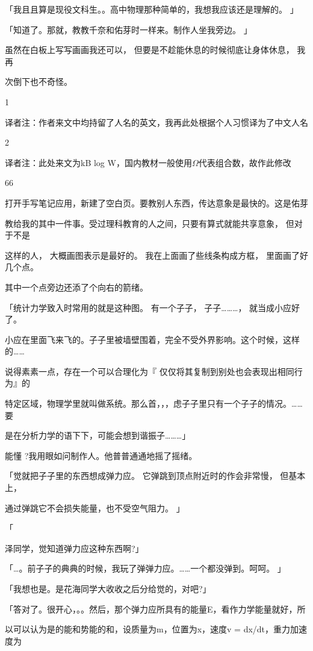 「我且且算是现役文科生。。高中物理那种简单的，我想我应该还是理解的。 」\par
「知道了。那就，教教千奈和佑芽时一样来。制作人坐我旁边。 」\par
虽然在白板上写写画画我还可以， 但要是不趁能休息的时候彻底让身体休息， 我再\par
次倒下也不奇怪。\par
1\par
译者注：作者来文中均持留了人名的英文，我再此处根据个人习惯译为了中文人名\par
2\par
译者注：此处来文为kB log W，国内教材一般使用$\Omega$代表组合数，故作此修改\par

66\par
打开手写笔记应用，新建了空白页。要教别人东西，传达意象是最快的。这是佑芽\par
教给我的其中一件事。受过理科教育的人之间，只要有算式就能共享意象， 但对于不是\par
这样的人， 大概画图表示是最好的。 我在上面画了些线条构成方框， 里面画了好几个点。\par
其中一个点旁边还添了个向右的箭绪。\par
「统计力学致入时常用的就是这种图。 有一个子子， 子子………， 就当成小应好了。\par
小应在里面飞来飞的。子子里被墙壁围着，完全不受外界影响。这个时候，这样的……\par
说得素素一点，存在一个可以合理化为『 仅仅将其复制到别处也会表现出相同行为』的\par
特定区域，物理学里就叫做系统。那么首，，，虑子子里只有一个子子的情况。……要\par
是在分析力学的语下下，可能会想到谐振子………」\par
能懂 ?我用眼如问制作人。他普普通通地摇了摇绪。\par
「觉就把子子里的东西想成弹力应。 它弹跳到顶点附近时的作会非常慢， 但基本上，\par
通过弹跳它不会损失能量，也不受空气阻力。 」\par
「\par
泽同学，觉知道弹力应这种东西啊?」\par
「…。前子子的典典的时候，我玩了弹弹力应。……一个都没弹到。呵呵。 」\par
「我想也是。是花海同学大收收之后分给觉的，对吧?」\par
「答对了。很开心，。。然后，那个弹力应所具有的能量E，看作力学能量就好，所\par
以可以认为是的能和势能的和，设质量为m，位置为x，速度v = dx/dt，重力加速度为\par
